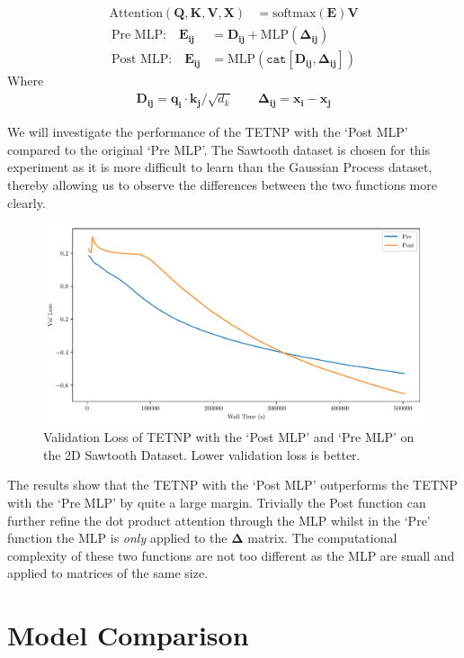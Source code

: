 \documentclass[../../main.tex]{subfiles}
\begin{document}
\begin{align}
	\text{Attention}(\bm{Q}, \bm{K}, \bm{V}, \bm{X}) &= \text{softmax}\left(\bm{E} \right) \bm{V}
\end{align}
\begin{align}
	\text{Pre MLP:} \quad \bm{E_{ij}} &= \bm{D_{ij}}+ \text{MLP}(\bm{\Delta_{ij}})\\
    \text{Post MLP:} \quad \bm{E_{ij}} &= \text{MLP}(\texttt{cat}[ \bm{D_{ij}}, \bm{\Delta_{ij}}])
\end{align}
Where 
\begin{align}
     \bm{D_{ij}} = \bm{q_i} \cdot \bm{k_j}  /\sqrt{d_k} \quad \quad    \bm{\Delta_{ij}} = \bm{x_i} - \bm{x_j}
\end{align}


We will investigate the performance of the TETNP with the `Post MLP' compared to the original `Pre MLP'. The Sawtooth dataset is chosen for this experiment as it is more difficult to learn than the Gaussian Process dataset, thereby allowing us to observe the differences between the two functions more clearly.

\begin{figure}[H]
    \centering
    \includegraphics[width=0.6\linewidth]{./fig/post-pre-kernel.pdf}
    \caption{Validation Loss of TETNP with the `Post MLP' and `Pre MLP' on the 2D Sawtooth Dataset. Lower validation loss is better.}
    \label{fig:post-pre-kernel}
\end{figure}


The results show that the TETNP with the `Post MLP' outperforms the TETNP with the `Pre MLP' by quite a large margin. Trivially the Post function can further refine the dot product attention through the MLP whilst in the `Pre' function the MLP is \emph{only} applied to the $\bm{\Delta}$ matrix. The computational complexity of these two functions are not too different as the MLP are small and applied to matrices of the same size.

\section{Model Comparison}
\end{document}
